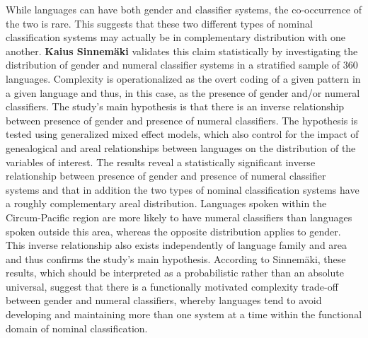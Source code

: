 \documentclass[output=collectionpaper]{langsci/langscibook}
\begin{document}
\largerpage
While languages can have both gender and classifier systems, the co-occur\-rence of the two is rare. This suggests that these two different types of nominal classification systems may actually be in complementary distribution with one another. \textbf{Kaius Sinnemäki} validates this claim statistically by investigating the distribution of gender and numeral classifier systems in a stratified sample of 360 languages. Complexity is operationalized as the overt coding of a given pattern in a given language and thus, in this case, as the presence of gender and/or numeral classifiers. The study’s main hypothesis is that there is an inverse relationship between presence of gender and presence of numeral classifiers. The hypothesis is tested using generalized mixed effect models, which also control for the impact of genealogical and areal relationships between languages on the distribution of the variables of interest. The results reveal a statistically significant inverse relationship between presence of gender and presence of numeral classifier systems and that in addition the two types of nominal classification systems have a roughly complementary areal distribution. Languages spoken within the Circum-Pacific region are more likely to have numeral classifiers than languages spoken outside this area, whereas the opposite distribution applies to gender. This inverse relationship also exists independently of language family and area and thus confirms the study’s main hypothesis. According to Sinnemäki, these results, which should be interpreted as a probabilistic rather than an absolute universal, suggest that there is a functionally motivated complexity trade-off between gender and numeral classifiers, whereby languages tend to avoid developing and maintaining more than one system at a time within the functional domain of nominal classification.
\end{document}
